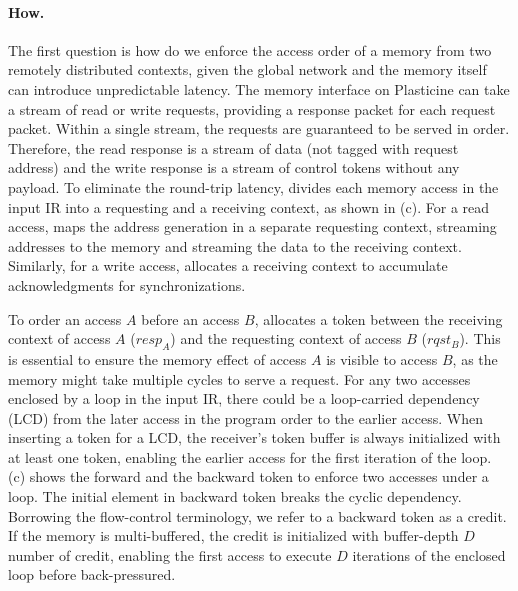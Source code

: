 
\paragraph{How.} 
The first question is how do we enforce the access order of a memory from two remotely distributed contexts, given the
global network and the memory itself can introduce unpredictable latency.
The memory interface on Plasticine can take a stream of read or write requests, providing a response
packet for each request packet.
Within a single stream, the requests are guaranteed to be served in order. 
Therefore, the read response is a stream of data (not tagged with request address) and the write response is a stream of control tokens without any payload.
To eliminate the round-trip latency, \name divides each memory access in the input IR into a requesting and a receiving context, as shown in  (c). 
For a read access, \name maps the address generation in a separate requesting context, streaming
addresses to the memory and streaming the data to the receiving context.
Similarly, for a write access, \name allocates a receiving context to accumulate acknowledgments 
for synchronizations.

To order an access $A$ before an access $B$,
\name allocates a token between the receiving context of access $A$ ($resp_A$) and the requesting context
of access $B$ ($rqst_B$).
This is essential to ensure the memory effect of access $A$ is visible to access $B$, as the memory
might take multiple cycles to serve a request.
For any two accesses enclosed by a loop in the input IR, there could be a loop-carried dependency (LCD) from
the later access in the program order to the earlier access.
When inserting a token for a LCD, the receiver's token buffer is always initialized with at least one token,
enabling the earlier access for the first iteration of the loop.  (c) shows the
forward and the backward token to enforce two accesses under a loop. The initial element in backward
token breaks the cyclic dependency. 
Borrowing the flow-control
terminology\cite{credit}, we refer to a backward token as a credit.
If the memory is multi-buffered, the credit is initialized with buffer-depth $D$ number of credit, 
enabling the first access to execute $D$ iterations of the enclosed loop before back-pressured.

